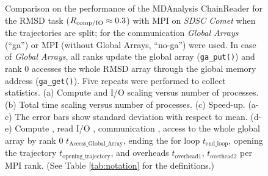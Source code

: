 \begin{figure}[!htb]
\caption{Comparison on the performance of the MDAnalysis ChainReader for the RMSD task ($R_{\text{comp/IO}} \approx 0.3$)  with MPI on \emph{SDSC Comet} when the trajectories are split; for the communication \emph{Global Arrays} (``ga'') or MPI (without Global Arrays, ``no-ga'') were used.
In case of \emph{Global Arrays}, all ranks update the global array (\texttt{ga\_put()}) and rank 0 accesses the whole RMSD array through the global memory address (\texttt{ga\_get()}).
Five repeats were performed to collect statistics.
(a) Compute and I/O scaling versus number of processes.
(b) Total time scaling versus number of processes.
(c) Speed-up.
(a-c) The error bars show standard deviation with respect to mean.
(d-e) Compute \tcomp, read I/O \tIO, communication \tcomm, access to the whole global array by rank 0 $t_{\text{Access\_Global\_Array}}$, ending the for loop $t_{\text{end\_loop}}$,  opening the trajectory $t_{\text{opening\_trajectory}}$, and overheads $t_{\text{overhead1}}$, $t_{\text{overhead2}}$ per MPI rank. (See Table \ref{tab:notation} for the definitions.)}
\label{fig:MPIwithIO-split-chain-reader}
\end{figure}

